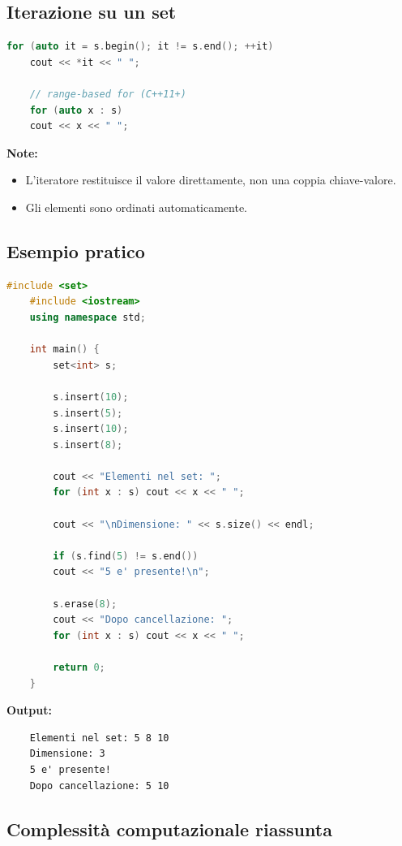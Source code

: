 \newpage
\subsection{Iterazione su un set}

\begin{lstlisting}[language=C++]
	for (auto it = s.begin(); it != s.end(); ++it)
	cout << *it << " ";
	
	// range-based for (C++11+)
	for (auto x : s)
	cout << x << " ";
\end{lstlisting}

\textbf{Note:}
\begin{itemize}
	\item L’iteratore restituisce il valore direttamente, non una coppia chiave-valore.
	\item Gli elementi sono ordinati automaticamente.
\end{itemize}


\subsection{Esempio pratico}

\begin{lstlisting}[language=C++]
	#include <set>
	#include <iostream>
	using namespace std;
	
	int main() {
		set<int> s;
		
		s.insert(10);
		s.insert(5);
		s.insert(10);
		s.insert(8);
		
		cout << "Elementi nel set: ";
		for (int x : s) cout << x << " ";
		
		cout << "\nDimensione: " << s.size() << endl;
		
		if (s.find(5) != s.end())
		cout << "5 e' presente!\n";
		
		s.erase(8);
		cout << "Dopo cancellazione: ";
		for (int x : s) cout << x << " ";
		
		return 0;
	}
\end{lstlisting}

\textbf{Output:}
\begin{verbatim}
	Elementi nel set: 5 8 10
	Dimensione: 3
	5 e' presente!
	Dopo cancellazione: 5 10
\end{verbatim}

\newpage

\subsection{Complessità computazionale riassunta}


